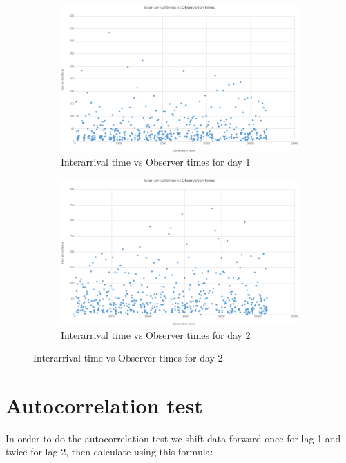 \documentclass{article}
\begin{document}
\begin{figure}[H]
    \begin{subfigure}{0.5\textwidth}
        \includegraphics[width=\linewidth]{day1-interarrival-timeseries.png}
        \caption{Interarrival time vs Observer times for day 1}
    \end{subfigure}
    \begin{subfigure}{0.5\textwidth}
        \includegraphics[width=\linewidth]{day2-interarrival-timeseries.png}
        \caption{Interarrival time vs Observer times for day 2}
    \end{subfigure}
\end{figure}

\pagebreak

\section{Autocorrelation test}
In order to do the autocorrelation test we shift data forward once for lag 1 and
twice for lag 2, then calculate using this formula:
\end{document}

